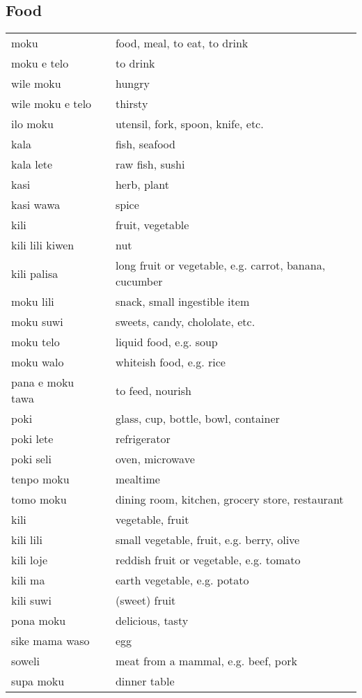 \subsection{Food}
%
\begin{supertabular}{p{4,5cm}|ll}
moku && food, meal, to eat, to drink \\
moku e telo && to drink \\
wile moku && hungry \\
wile moku e telo && thirsty \\
ilo moku && utensil, fork, spoon, knife, etc. \\
kala && fish, seafood \\
kala lete && raw fish, sushi \\
kasi && herb, plant \\
kasi wawa && spice \\
kili && fruit, vegetable \\
kili lili kiwen && nut \\
kili palisa && long fruit or vegetable, e.g. carrot, banana, cucumber \\
moku lili && snack, small ingestible item \\
moku suwi && sweets, candy, chololate, etc. \\
moku telo && liquid food, e.g. soup \\
moku walo && whiteish food, e.g. rice \\
pana e moku tawa && to feed, nourish \\
poki && glass, cup, bottle, bowl, container \\
poki lete && refrigerator \\
poki seli && oven, microwave \\
tenpo moku && mealtime \\
tomo moku && dining room, kitchen, grocery store, restaurant \\
kili && vegetable, fruit \\
kili lili && small vegetable, fruit, e.g. berry, olive \\
kili loje && reddish fruit or vegetable, e.g. tomato \\
kili ma && earth vegetable, e.g. potato \\
kili suwi && (sweet) fruit \\
pona moku && delicious, tasty \\
sike mama waso && egg \\
soweli && meat from a mammal, e.g. beef, pork \\
supa moku && dinner table \\

\end{supertabular}
